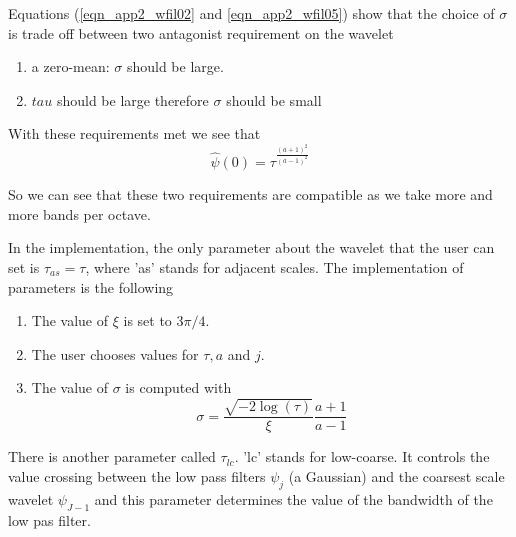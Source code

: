 Equations (\ref{eqn_app2_wfil02} and \ref{eqn_app2_wfil05}) show that the choice of $\sigma$ is  trade off between two antagonist requirement on the wavelet
\begin{enumerate}
    \item a zero-mean: $\sigma$ should be large.
    \item $tau$ should be large therefore $\sigma$ should be small
\end{enumerate}

With these requirements met we see that
\begin{equation}
    \hat{\psi}(0)=\tau^\frac{(a+1)^2}{(a-1)^2}
\end{equation}

So we can see that these two requirements are compatible as we take more and more bands per octave.

In the implementation, the only parameter about the wavelet that the user can set is $\tau_{as}=\tau$, where 'as' stands for adjacent scales.  The implementation of parameters is the following
\begin{enumerate}
    \item The value of $\xi$ is set to $3\pi/4$.
    \item The user chooses values for $\tau,a$ and $j$.
    \item The value of $\sigma$ is computed with
    \begin{equation}
        \sigma=\frac{\sqrt{-2\log(\tau)}}{\xi}\frac{a+1}{a-1}
    \end{equation}
\end{enumerate}

There is another parameter called $\tau_{lc}$.  'lc' stands for low-coarse.  It controls the value crossing between the low pass filters $\psi_j$ (a Gaussian) and the coarsest scale wavelet $\psi_{J-1}$ and this parameter determines the value of the bandwidth of the low pas filter.

